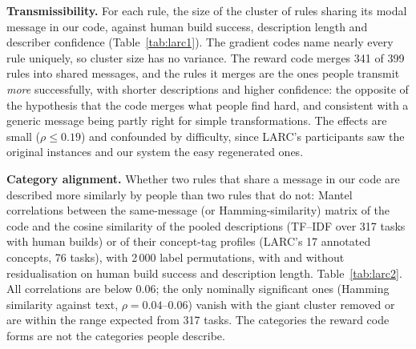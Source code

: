\documentclass[11pt]{article}
\begin{document}
\textbf{Transmissibility.} For each rule, the size of the cluster of rules sharing its modal message
in our code, against human build success, description length and describer confidence
(Table~\ref{tab:larc1}). The gradient codes name nearly every rule uniquely, so cluster size has no
variance. The reward code merges 341 of 399 rules into shared messages, and the rules it merges are
the ones people transmit \emph{more} successfully, with shorter descriptions and higher confidence: the
opposite of the hypothesis that the code merges what people find hard, and consistent with a generic
message being partly right for simple transformations. The effects are small ($\rho \le 0.19$) and
confounded by difficulty, since LARC's participants saw the original instances and our system the easy
regenerated ones.

\begin{table}[h]\centering\small
{}
\caption{Rule-level correlation (Spearman) between the size of a rule's message cluster and human
transmissibility measures from LARC ($n = 399$ rules).}\label{tab:larc1}
\end{table}

\textbf{Category alignment.} Whether two rules that share a message in our code are described more
similarly by people than two rules that do not: Mantel correlations between the same-message (or
Hamming-similarity) matrix of the code and the cosine similarity of the pooled descriptions (TF--IDF
over 317 tasks with human builds) or of their concept-tag profiles (LARC's 17 annotated concepts, 76
tasks), with 2\,000 label permutations, with and without residualisation on human build success and
description length. Table~\ref{tab:larc2}. All correlations are below 0.06; the only nominally
significant ones (Hamming similarity against text, $\rho = 0.04$--$0.06$) vanish with the giant
cluster removed or are within the range expected from 317 tasks. The categories the reward code forms
are not the categories people describe.
\end{document}
